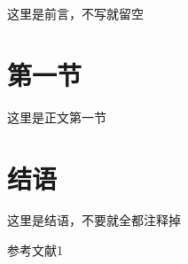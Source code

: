 \documentclass[a4paper,12pt]{ctexart}
\newcommand{\upcite}[1]{\textsuperscript{\cite{#1}}} %
\begin{document}
\maketitle %

这里是前言，不写就留空
\newpage
\section{第一节}
这里是正文第一节
\newpage

\section*{结语}
这里是结语，不要就全都注释掉\upcite{m1}

\renewcommand{\refname}{参考文献}
\begin{thebibliography}{99}
	 参考文献1
\end{thebibliography}
\end{document}
